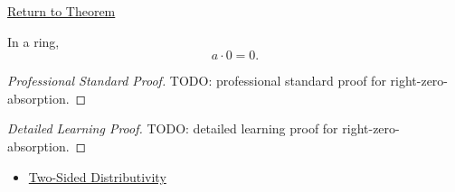 \newpage
{}
\label{prf:right-zero-absorption}

\begin{remark*}[Return]
\hyperref[prop:right-zero-absorption]{Return to Theorem}
\end{remark*}

\begin{proposition*}
In a ring,
\[
a\cdot 0=0.
\]
\end{proposition*}

\begin{proof}[Professional Standard Proof]
\LRAProofBodyStart
TODO: professional standard proof for right-zero-absorption.
\end{proof}

\begin{proof}[Detailed Learning Proof]
\LRAProofBodyStart
TODO: detailed learning proof for right-zero-absorption.
\end{proof}

\begin{remark*}
\end{remark*}

\begin{dependencies}
\begin{itemize}
  \item \hyperref[def:two-sided-distributivity]{Two-Sided Distributivity}
\end{itemize}
\end{dependencies}

\clearpage
